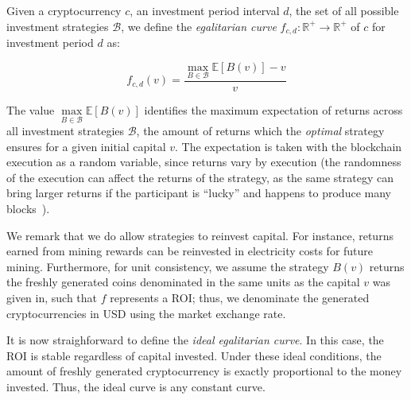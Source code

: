 \begin{definition}
    Given a cryptocurrency $c$, an investment period interval $d$, the set of
    all possible investment strategies $\mathcal{B}$, we define the \emph{egalitarian curve}
    $f_{c,d}: \mathbb{R}^+ \longrightarrow \mathbb{R}^+$ of $c$ for
    investment period $d$ as:

    \[
        f_{c,d}(v) = \frac{\underset{B \in \mathcal{B}}{\max}{\mathbb{E}[B(v)]} - v}{v}
    \]
\end{definition}

The value $\underset{B \in \mathcal{B}}{\max}{\mathbb{E}[B(v)]}$ identifies the maximum expectation of
returns across all investment strategies $\mathcal{B}$, \ie the amount of
returns which the \emph{optimal} strategy ensures for a given initial capital $v$.
The expectation is taken with the blockchain execution as a random variable,
since returns vary by execution (the randomness of the execution can affect the
returns of the strategy, as the same strategy can bring larger returns if the
participant is ``lucky'' and happens to produce many blocks~\cite{equitability}).

We remark that we do allow strategies to reinvest capital. For instance,
returns earned from mining rewards can be reinvested in electricity costs for
future mining. Furthermore, for unit consistency, we assume the strategy
$B(v)$ returns the freshly generated coins denominated in the same units as the capital $v$
was given in, such that $f$ represents a ROI; thus, we denominate the
generated cryptocurrencies in USD using the market exchange rate.

It is now straighforward to define the \emph{ideal egalitarian curve}. In this
case, the ROI is stable regardless of capital invested. Under these ideal
conditions, the amount of freshly generated cryptocurrency is exactly
proportional to the money invested. Thus, the ideal curve is any constant
curve.

%

